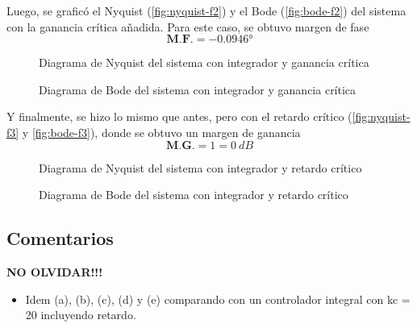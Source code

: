 Luego, se graficó el Nyquist (\autoref{fig:nyquist-f2}) y el Bode (\autoref{fig:bode-f2})
del sistema con la ganancia crítica añadida. Para este caso, se obtuvo margen de fase
\begin{equation}
  \boxed{\textbf{M.F.} = \ang{-0.0946}}
\end{equation}

\begin{figure}[h]
  \centering
  
  \caption{Diagrama de Nyquist del sistema con integrador y ganancia crítica}
  \label{fig:nyquist-f2}
\end{figure}

\begin{figure}[h]
  \centering
  
  \caption{Diagrama de Bode del sistema con integrador y ganancia crítica}
  \label{fig:bode-f2}
\end{figure}

Y finalmente, se hizo lo mismo que antes, pero con el retardo crítico (\autoref{fig:nyquist-f3}
y \autoref{fig:bode-f3}), donde se obtuvo un margen de ganancia
\begin{equation}
  \boxed{\textbf{M.G.} = 1 = 0\ \unit{dB}}
\end{equation}

\begin{figure}[h]
  \centering
  
  \caption{Diagrama de Nyquist del sistema con integrador y retardo crítico}
  \label{fig:nyquist-f3}
\end{figure}

\begin{figure}[h]
  \centering
  
  \caption{Diagrama de Bode del sistema con integrador y retardo crítico}
  \label{fig:bode-f3}
\end{figure}

\FloatBarrier
\subsection{Comentarios}

\textbf{NO OLVIDAR!!!}

\begin{itemize}
  \item Idem (a), (b), (c), (d) y (e) comparando con un controlador integral con kc = 20 incluyendo retardo.
\end{itemize}
